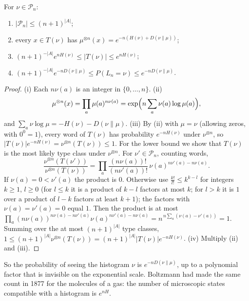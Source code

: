 \begin{lemma}\label{lem:types}
For $\nu\in\mathcal P_n$:
\begin{enumerate}[label=(\roman*)]
\item $|\mathcal P_n|\le(n+1)^{|A|}$;
\item every $x\in T(\nu)$ has $\mu^{\otimes n}(x)=e^{-n(H(\nu)+D(\nu\|\mu))}$;
\item $(n+1)^{-|A|}e^{nH(\nu)}\le|T(\nu)|\le e^{nH(\nu)}$;
\item $(n+1)^{-|A|}e^{-nD(\nu\|\mu)}\le P(L_n=\nu)\le e^{-nD(\nu\|\mu)}$.
\end{enumerate}
\end{lemma}
\begin{proof}
(i) Each $n\nu(a)$ is an integer in $\{0,\dots,n\}$. (ii)
\[
\mu^{\otimes n}(x)=\prod_a\mu(a)^{n\nu(a)}=\exp\Bigl(n\sum_a\nu(a)\log\mu(a)\Bigr),
\]
and $\sum_a\nu\log\mu=-H(\nu)-D(\nu\|\mu)$.
(iii) By (ii) with $\mu=\nu$ (allowing zeros, with $0^0=1$), every word of $T(\nu)$ has probability $e^{-nH(\nu)}$ under $\nu^{\otimes n}$, so $|T(\nu)|e^{-nH(\nu)}=\nu^{\otimes n}(T(\nu))\le1$.
For the lower bound we show that $T(\nu)$ is the most likely type class under $\nu^{\otimes n}$. For $\nu'\in\mathcal P_n$, counting words,
\[
\frac{\nu^{\otimes n}(T(\nu'))}{\nu^{\otimes n}(T(\nu))}=\prod_a\frac{(n\nu(a))!}{(n\nu'(a))!}\,\nu(a)^{n\nu'(a)-n\nu(a)}.
\]
If $\nu(a)=0<\nu'(a)$ the product is $0$. Otherwise use $\frac{k!}{l!}\le k^{k-l}$ for integers $k\ge1$, $l\ge0$ (for $l\le k$ it is a product of $k-l$ factors at most $k$; for
$l>k$ it is $1$ over a product of $l-k$ factors at least $k+1$); the factors with $\nu(a)=\nu'(a)=0$ equal $1$. Then the product is at most
$\prod_a(n\nu(a))^{n\nu(a)-n\nu'(a)}\nu(a)^{n\nu'(a)-n\nu(a)}=n^{\,n\sum_a(\nu(a)-\nu'(a))}=1$. Summing over the at most $(n+1)^{|A|}$ type classes,
$1\le(n+1)^{|A|}\nu^{\otimes n}(T(\nu))=(n+1)^{|A|}|T(\nu)|e^{-nH(\nu)}$. (iv) Multiply (ii) and (iii).
\end{proof}

So the probability of seeing the histogram $\nu$ is $e^{-nD(\nu\|\mu)}$, up to a polynomial factor that is invisible on the exponential scale. Boltzmann had made the same count in
1877 for the molecules of a gas: the number of microscopic states compatible with a histogram is $e^{nH}$.

